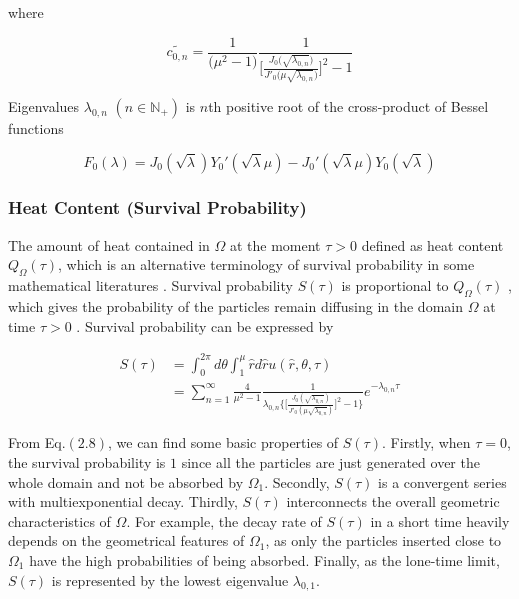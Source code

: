 where

$$\tilde{c_{0,n}} = \frac{1}{\big(\mu^2 - 1\big)}
\frac{1}{\bigg[\frac{J_0\big(\sqrt{\lambda_{0,n}}\big)}{J'_0\big(\mu
      \sqrt{\lambda_{0,n}}\big)}\bigg]^2 -1}$$


Eigenvalues $\lambda_{0, n}$ $(n \in \mathbb{N}_{+})$ is $n$th
positive root of the cross-product of Bessel functions
\cite{watson1995treatise}

\begin{equation}
  F_0(\lambda) = J_0(\sqrt{\lambda}) Y_0'(\sqrt{\lambda} \mu) -
  J_0'(\sqrt{\lambda} \mu) Y_0(\sqrt{\lambda})
\end{equation}



\subsubsection{Heat Content (Survival Probability)}

The amount of heat contained in $\Omega$ at the moment $\tau > 0$
defined as heat content $Q_{\Omega}(\tau)$, which is an alternative
terminology of survival probability in some mathematical literatures
\cite{birkhoff1954note} \cite{van1994heat}
\cite{gilkey1994heat}. Survival probability $S(\tau)$ is proportional
to $Q_{\Omega}(\tau)$ \cite{kalinay2011survival}, which gives the
probability of the particles remain diffusing in the domain $\Omega$
at time $\tau > 0$ \cite{aalen2008survival}. Survival probability can
be expressed by

\begin{equation}
  \begin{split}
    S(\tau) &= \int_{0}^{2\pi} d\theta \int_{1}^{\mu} \hat r d \hat r
    u(\hat r, \theta, \tau)\\ &= \sum_{n=1}^{\infty} \frac{4}{\mu^2 -
      1} \frac{1}{\lambda_{0,n}
      \bigg\{\bigg[\frac{J_0(\sqrt{\lambda_{0,n}})}{J'_0(\mu
          \sqrt{\lambda_{0,n}})}\bigg]^2 -1\bigg\}} e^{-\lambda_{0, n}
      \tau}
  \end{split}
\end{equation}

From Eq.$(2.8)$, we can find some basic properties of
$S(\tau)$. Firstly, when $\tau=0$, the survival probability is $1$
since all the particles are just generated over the whole domain and
not be absorbed by $\Omega_1$. Secondly, $S(\tau)$ is a convergent
series with multiexponential decay. Thirdly, $S(\tau)$ interconnects
the overall geometric characteristics of $\Omega$. For example, the
decay rate of $S(\tau)$ in a short time heavily depends on the
geometrical features of $\Omega_1$, as only the particles inserted
close to $\Omega_1$ have the high probabilities of being
absorbed. Finally, as the lone-time limit, $S(\tau)$ is represented by
the lowest eigenvalue $\lambda_{0, 1}$.

